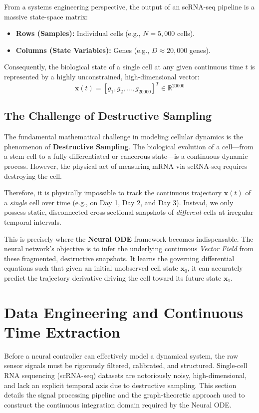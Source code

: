 \documentclass[12pt, a4paper]{article}
\begin{document}
	From a systems engineering perspective, the output of an scRNA-seq pipeline is a massive state-space matrix:
	\begin{itemize}
		\item \textbf{Rows (Samples):} Individual cells (e.g., $N = 5,000$ cells).
		\item \textbf{Columns (State Variables):} Genes (e.g., $D \approx 20,000$ genes).
	\end{itemize}
	Consequently, the biological state of a single cell at any given continuous time $t$ is represented by a highly unconstrained, high-dimensional vector:
	$$ \mathbf{x}(t) = [g_1, g_2, \dots, g_{20000}]^T \in \mathbb{R}^{20000} $$
	
	\subsection{The Challenge of Destructive Sampling}
	The fundamental mathematical challenge in modeling cellular dynamics is the phenomenon of \textbf{Destructive Sampling}. The biological evolution of a cell—from a stem cell to a fully differentiated or cancerous state—is a continuous dynamic process. However, the physical act of measuring mRNA via scRNA-seq requires destroying the cell. 
	
	Therefore, it is physically impossible to track the continuous trajectory $\mathbf{x}(t)$ of a \textit{single} cell over time (e.g., on Day 1, Day 2, and Day 3). Instead, we only possess static, disconnected cross-sectional snapshots of \textit{different} cells at irregular temporal intervals. 
	
	This is precisely where the \textbf{Neural ODE} framework becomes indispensable. The neural network's objective is to infer the underlying continuous \textit{Vector Field} from these fragmented, destructive snapshots. It learns the governing differential equations such that given an initial unobserved cell state $\mathbf{x}_0$, it can accurately predict the trajectory derivative driving the cell toward its future state $\mathbf{x}_1$.
	
	\section{Data Engineering and Continuous Time Extraction}
	
	Before a neural controller can effectively model a dynamical system, the raw sensor signals must be rigorously filtered, calibrated, and structured. Single-cell RNA sequencing (scRNA-seq) datasets are notoriously noisy, high-dimensional, and lack an explicit temporal axis due to destructive sampling. This section details the signal processing pipeline and the graph-theoretic approach used to construct the continuous integration domain required by the Neural ODE.
	
\end{document}
